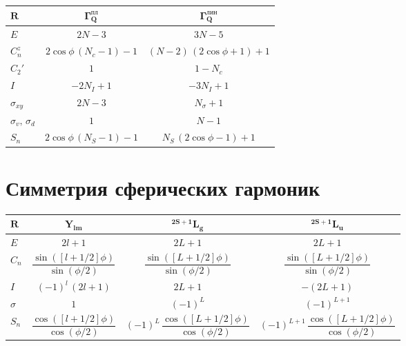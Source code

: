 \begin{center}
\begin{tabular}{ |C{1cm}|c|c| }
 \hline
 $\mathbf{R}$ & $\mathbf{\Gamma_Q^{\text{пл}}}$ & $\mathbf{\Gamma_Q^{\text{лин}}}$ \\[0.35ex]
 \hline\hline
 $E$ & $2N-3$ & $3N-5$ \\[0.35ex]
 \hline
 $C_n^z$ & $2\cos \phi\,(N_c-1)-1$ & $(N-2)\,(2\cos\phi+1)+1$ \\[0.35ex]
 \hline
 $C_2'$ & $1$ & $1-N_c$ \\[0.35ex]
 \hline
 $I$ & $-2N_I+1$ & $-3N_I+1$ \\[0.35ex]
 \hline
 $\sigma_{xy}$ & $2N-3$ &  $N_\sigma +1 $\\[0.35ex]
 \hline
 $\sigma_{v},\,\sigma_{d}$ & $1$ & $N-1$\\[0.35ex]
 \hline
 $S_{n}$ & $2\cos \phi\,(N_S-1)-1$ & $N_S\,(2\cos\phi-1)+1$ \\[0.35ex]
 \hline
\end{tabular}
\end{center}


\section{Симметрия сферических гармоник}

\begin{center}
\begin{tabular}{ |C{1cm}|c|c|c| }
 \hline
 $\mathbf{R}$ & $\mathbf{Y_{lm}}$ & $\mathbf{^{2S+1}L_g}$ & $\mathbf{^{2S+1}L_u}$ \\[1.5ex]
 \hline\hline
 $E$ & $2l+1$ & $2L+1$ & $2L+1$ \\[1.5ex]
 \hline
 $C_n$ & $\dfrac{\sin{\left( [l+1/2]\phi \right)}}{\sin(\phi/2)}$ & $\dfrac{\sin{\left( [L+1/2]\phi \right)}}{\sin(\phi/2)}$ & $\dfrac{\sin{\left( [L+1/2]\phi \right)}}{\sin(\phi/2)}$ \\[1.5ex]
 \hline
 $I$ & $(-1)^l\,(2l+1)$ & $2L+1$ & $-(2L+1)$ \\[1.5ex]
 \hline
 $\sigma$ & $1$ & $(-1)^L$ & $(-1)^{L+1}$ \\[1.5ex]
 \hline
 $S_n$ & $\dfrac{\cos{\left( [l+1/2]\phi \right)}}{\cos(\phi/2)}$ & $(-1)^L\,\dfrac{\cos{\left( [L+1/2]\phi \right)}}{\cos(\phi/2)}$ & $(-1)^{L+1}\,\dfrac{\cos{\left( [L+1/2]\phi \right)}}{\cos(\phi/2)}$  \\[1.5ex]
 \hline
\end{tabular}
\end{center}

